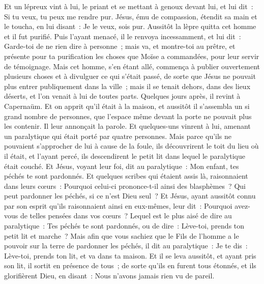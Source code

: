\begin{multicols}{2}
Et un lépreux vint à lui, le priant et se mettant à genoux devant lui, et lui dit~: Si tu veux, tu peux me rendre pur.
Jésus, ému de compassion, étendit sa main et le toucha, en lui disant~: Je le veux, sois pur.
Aussitôt la lèpre quitta cet homme et il fut purifié.
Puis l'ayant menacé, il le renvoya incessamment,
et lui dit~: Garde-toi de ne rien dire à personne~; mais va, et montre-toi au prêtre, et présente pour ta purification les choses que Moïse a commandées, pour leur servir de témoignage.
Mais cet homme, s'en étant allé, commença à publier ouvertement plusieurs choses et à divulguer ce qui s'était passé, de sorte que Jésus ne pouvait plus entrer publiquement dans la ville~; mais il se tenait dehors, dans des lieux déserts, et l'on venait à lui de toutes parts.
\VerseOne{}Quelques jours après, il revint à Capernaüm. Et on apprit qu'il était à la maison,
et aussitôt il s'assembla un si grand nombre de personnes, que l'espace même devant la porte ne pouvait plus les contenir. Il leur annonçait la parole.
Et quelques-uns vinrent à lui, amenant un paralytique qui était porté par quatre personnes.
Mais parce qu'ils ne pouvaient s'approcher de lui à cause de la foule, ils découvrirent le toit du lieu où il était, et l'ayant percé, ils descendirent le petit lit dans lequel le paralytique était couché.
Et Jésus, voyant leur foi, dit au paralytique~: Mon enfant, tes péchés te sont pardonnés.
Et quelques scribes qui étaient assis là, raisonnaient dans leurs cœurs~:
Pourquoi celui-ci prononce-t-il ainsi des blasphèmes~? Qui peut pardonner les péchés, si ce n'est Dieu seul~?
Et Jésus, ayant aussitôt connu par son esprit qu'ils raisonnaient ainsi en eux-mêmes, leur dit~: Pourquoi avez-vous de telles pensées dans vos cœurs~?
Lequel est le plus aisé de dire au paralytique~: Tes péchés te sont pardonnés, ou de dire~: Lève-toi, prends ton petit lit et marche~?
Mais afin que vous sachiez que le Fils de l'homme a le pouvoir sur la terre de pardonner les péchés, il dit au paralytique~:
Je te dis~: Lève-toi, prends ton lit, et va dans ta maison.
Et il se leva aussitôt, et ayant pris son lit, il sortit en présence de tous~; de sorte qu'ils en furent tous étonnés, et ils glorifièrent Dieu, en disant~: Nous n'avons jamais rien vu de pareil.

\end{multicols}
